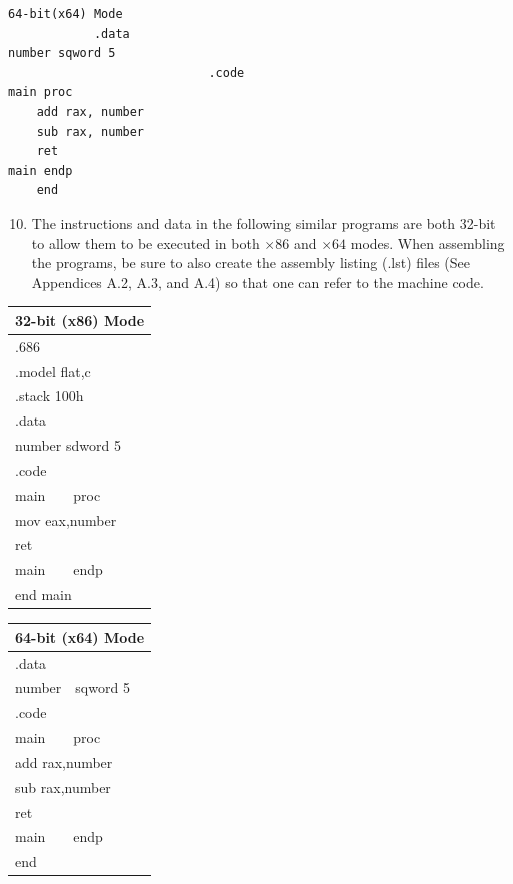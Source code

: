 \documentclass[10pt]{book}
\begin{document}
\begin{verbatim}
64-bit(x64) Mode
            .data
number sqword 5
                            .code
main proc
    add rax, number
    sub rax, number
    ret
main endp
    end
\end{verbatim}

\begin{enumerate}
  \setcounter{enumi}{9}
  \item The instructions and data in the following similar programs are both 32-bit to allow them to be executed in both $\times 86$ and $\times 64$ modes. When assembling the programs, be sure to also create the assembly listing (.lst) files (See Appendices A.2, A.3, and A.4) so that one can refer to the machine code.
\end{enumerate}
\begin{center}
\begin{tabular}{|l|}
\hline
32-bit (x86) Mode \\
\hline
.686 \\
.model flat,c \\
.stack 100h \\
.data \\
number sdword 5 \\
.code \\
main\ \ \ \ proc \\
mov eax,number \\
ret \\
main\ \ \ \ endp \\
end main \\
\hline
\end{tabular}
\end{center}

\begin{center}
\begin{tabular}{|l|}
\hline
64-bit (x64) Mode \\
\hline
.data \\
number\ \ sqword 5 \\
.code \\
main\ \ \ \ proc \\
add rax,number \\
sub rax,number \\
ret \\
main\ \ \ \ endp \\
end \\
\hline
\end{tabular}
\end{center}
\end{document}

